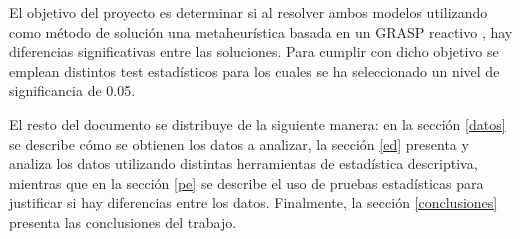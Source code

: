\documentclass[preprint,12pt,authoryear]{elsarticle}
\begin{document}
%
%


El objetivo del proyecto es determinar si al resolver ambos modelos utilizando como método de solución una metaheurística basada en un GRASP reactivo \citep{tesis}, hay diferencias significativas entre las soluciones. Para cumplir con dicho objetivo se emplean distintos test estadísticos para los cuales se ha seleccionado un nivel de significancia de 0.05.

El resto del documento se distribuye de la siguiente manera: en la sección \ref{datos} se describe cómo se obtienen los datos a analizar, la sección \ref{ed} presenta y analiza los datos utilizando distintas herramientas de estadística descriptiva, mientras que en la sección \ref{pe} se describe el uso de pruebas estadísticas para justificar si hay diferencias entre los datos. Finalmente, la sección \ref{conclusiones} presenta las conclusiones del trabajo.
\end{document}
